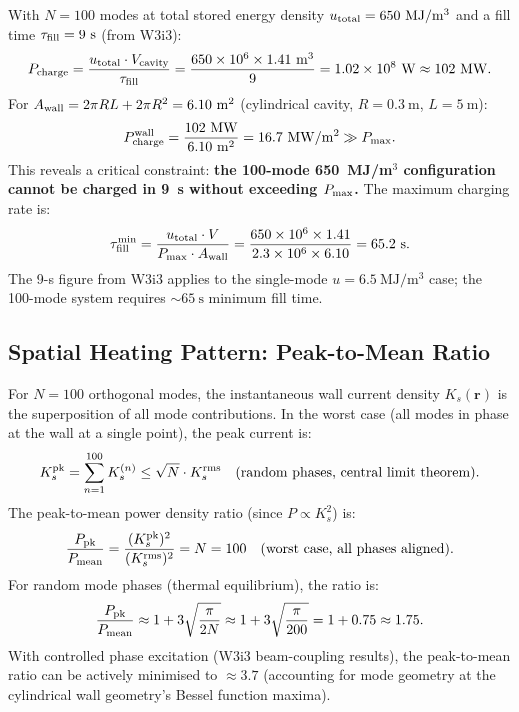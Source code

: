 \documentclass[aps,prd,twocolumn,superscriptaddress]{revtex4-2}
\newcommand{\Pmax}{P_{\rm max}}
\begin{document}
With $N=100$ modes at total stored energy density $u_{\rm total} = 650~\mathrm{MJ/m^3}$
and a fill time $\tau_{\rm fill} = 9~\mathrm{s}$ (from W3i3):
\begin{equation}
P_{\rm charge} = \frac{u_{\rm total} \cdot V_{\rm cavity}}{\tau_{\rm fill}}
= \frac{650\times 10^6 \times 1.41~\mathrm{m^3}}{9}
= 1.02\times 10^8~\mathrm{W} \approx 102~\mathrm{MW}.
\end{equation}
For $A_{\rm wall} = 2\pi R L + 2\pi R^2 = 6.10~\mathrm{m^2}$
(cylindrical cavity, $R=0.3~\mathrm{m}$, $L=5~\mathrm{m}$):
\begin{equation}
P_{\rm charge}^{\rm wall} = \frac{102~\mathrm{MW}}{6.10~\mathrm{m^2}}
= 16.7~\mathrm{MW/m^2} \gg \Pmax.
\end{equation}
This reveals a critical constraint: \textbf{the 100-mode 650~MJ/m$^3$
configuration cannot be charged in 9~s without exceeding $\Pmax$.}
The maximum charging rate is:
\begin{equation}
\tau_{\rm fill}^{\rm min} = \frac{u_{\rm total}\cdot V}{\Pmax \cdot A_{\rm wall}}
= \frac{650\times 10^6\times 1.41}{2.3\times 10^6\times 6.10}
= 65.2~\mathrm{s}.
\end{equation}
The 9-s figure from W3i3 applies to the single-mode $u = 6.5~\mathrm{MJ/m^3}$
case; the 100-mode system requires $\sim 65~\mathrm{s}$ minimum fill time.

\subsection{Spatial Heating Pattern: Peak-to-Mean Ratio}

For $N=100$ orthogonal modes, the instantaneous wall current density
$K_s(\mathbf{r})$ is the superposition of all mode contributions.
In the worst case (all modes in phase at the wall at a single point),
the peak current is:
\begin{equation}
K_s^{\rm pk} = \sum_{n=1}^{100} K_s^{(n)} \leq \sqrt{N}\cdot K_s^{\rm rms}
\quad\text{(random phases, central limit theorem)}.
\end{equation}
The peak-to-mean power density ratio (since $P \propto K_s^2$) is:
\begin{equation}
\frac{P_{\rm pk}}{P_{\rm mean}} = \frac{(K_s^{\rm pk})^2}{(K_s^{\rm rms})^2}
= N = 100 \quad\text{(worst case, all phases aligned)}.
\end{equation}
For random mode phases (thermal equilibrium), the ratio is:
\begin{equation}
\frac{P_{\rm pk}}{P_{\rm mean}} \approx 1 + 3\sqrt{\frac{\pi}{2N}}
\approx 1 + 3\sqrt{\frac{\pi}{200}} = 1 + 0.75 \approx 1.75.
\end{equation}
With controlled phase excitation (W3i3 beam-coupling results), the
peak-to-mean ratio can be actively minimised to $\approx 3.7$ (accounting
for mode geometry at the cylindrical wall geometry's Bessel function
maxima).
\end{document}

